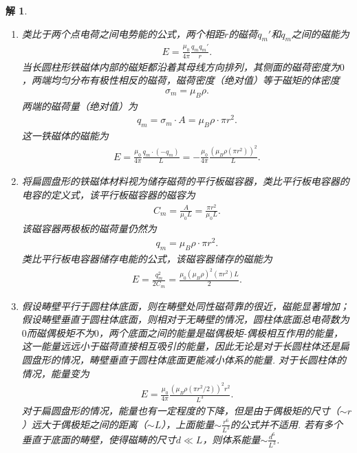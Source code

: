 \documentclass[UTF8,10pt,a4paper]{article}
\theoremstyle{Problem}
\theoremstyle{Solution}
\newtheorem*{sol}{解}
\begin{document}
\begin{sol}
    \begin{enumerate}
        \item[(a)] 类比于两个点电荷之间电势能的公式，两个相距$r$的磁荷$q_m'$和$q_m$之间的磁能为
        \begin{align}
            E=\frac{\mu_0}{4\pi}\frac{q_mq_m'}{r}.
        \end{align}
        当长圆柱形铁磁体内部的磁矩都沿着其母线方向排列，其侧面的磁荷密度为$0$，两端均匀分布有极性相反的磁荷，磁荷密度（绝对值）等于磁矩的体密度
        \begin{align}
            \sigma_m=\mu_B\rho.
        \end{align}
        两端的磁荷量（绝对值）为
        \begin{align}
            q_m=\sigma_m\cdot A=\mu_B\rho\cdot\pi r^2.
        \end{align}
        这一铁磁体的磁能为
        \begin{align}
            E=\frac{\mu_0}{4\pi}\frac{q_m\cdot(-q_m)}{L}=-\frac{\mu_0}{4\pi}\frac{(\mu_B\rho(\pi r^2))^2}{L}.
        \end{align}
        \item[(b)] 将扁圆盘形的铁磁体材料视为储存磁荷的平行板磁容器，类比平行板电容器的电容的定义式，该平行板磁容器的磁容为
        \begin{align}
            C_m=\frac{A}{\mu_0L}=\frac{\pi r^2}{\mu_0L}.
        \end{align}
        该磁容器两极板的磁荷量仍然为
        \begin{align}
            q_m=\mu_B\rho\cdot\pi r^2.
        \end{align}
        类比平行板电容器储存电能的公式，该磁容器储存的磁能为
        \begin{align}
            E=\frac{q_m^2}{2C_m}=\frac{\mu_0(\mu_B\rho)^2(\pi r^2)L}{2}.
        \end{align}
        \item[(c)] 假设畴壁平行于圆柱体底面，则在畴壁处同性磁荷靠的很近，磁能显著增加；假设畴壁垂直于圆柱体底面，则相对于无畴壁的情况，圆柱体底面总电荷数为$0$而磁偶极矩不为$0$，两个底面之间的能量是磁偶极矩-偶极相互作用的能量，这一能量远远小于磁荷直接相互吸引的能量，因此无论是对于长圆柱体还是扁圆盘形的情况，畴壁垂直于圆柱体底面更能减小体系的能量. 对于长圆柱体的情况，能量变为
        \begin{align}
            E=\frac{\mu_0}{4\pi}\frac{(\mu_B\rho(\pi r^2/2))^2r^2}{L^3}.
        \end{align}
        对于扁圆盘形的情况，能量也有一定程度的下降，但是由于偶极矩的尺寸（$\sim r$）远大于偶极矩之间的距离（$\sim L$），上面能量$\sim\frac{r^6}{L^3}$的公式并不适用. 若有多个垂直于底面的畴壁，使得磁畴的尺寸$d\ll L$，则体系能量$\sim\frac{d^6}{L^3}$.

\end{enumerate}
\end{sol}
\end{document}
